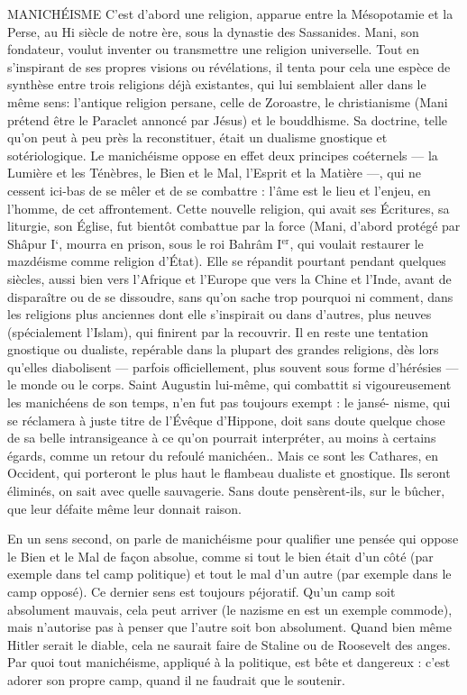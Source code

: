MANICHÉISME C'est d’abord une religion, apparue entre la Mésopotamie
et la Perse, au Hi siècle de notre ère, sous la dynastie des
Sassanides. Mani, son fondateur, voulut inventer ou transmettre une religion
universelle. Tout en s’inspirant de ses propres visions ou révélations, il tenta
pour cela une espèce de synthèse entre trois religions déjà existantes, qui lui
semblaient aller dans le même sens: l’antique religion persane, celle de
Zoroastre, le christianisme (Mani prétend être le Paraclet annoncé par Jésus)
et le bouddhisme. Sa doctrine, telle qu’on peut à peu près la reconstituer,
était un dualisme gnostique et sotériologique. Le manichéisme oppose en
effet deux principes coéternels — la Lumière et les Ténèbres, le Bien et le Mal,
l'Esprit et la Matière —, qui ne cessent ici-bas de se mêler et de se combattre :
l’âme est le lieu et l’enjeu, en l’homme, de cet affrontement. Cette nouvelle
religion, qui avait ses Écritures, sa liturgie, son Église, fut bientôt combattue
par la force (Mani, d’abord protégé par Shâpur I‘, mourra en prison, sous le
roi Bahrâm I$^\text{er}$, qui voulait restaurer le mazdéisme comme religion d’État).
Elle se répandit pourtant pendant quelques siècles, aussi bien vers l'Afrique
et l’Europe que vers la Chine et l’Inde, avant de disparaître ou de se dissoudre,
sans qu’on sache trop pourquoi ni comment, dans les religions plus
anciennes dont elle s’inspirait ou dans d’autres, plus neuves (spécialement
l'Islam), qui finirent par la recouvrir. Il en reste une tentation gnostique ou
dualiste, repérable dans la plupart des grandes religions, dès lors qu’elles diabolisent
— parfois officiellement, plus souvent sous forme d’hérésies — le
monde ou le corps. Saint Augustin lui-même, qui combattit si vigoureusement
les manichéens de son temps, n’en fut pas toujours exempt : le jansé-
nisme, qui se réclamera à juste titre de l’Évêque d’Hippone, doit sans doute
quelque chose de sa belle intransigeance à ce qu’on pourrait interpréter, au
moins à certains égards, comme un retour du refoulé manichéen.. Mais ce
sont les Cathares, en Occident, qui porteront le plus haut le flambeau dualiste
et gnostique. Ils seront éliminés, on sait avec quelle sauvagerie. Sans
doute pensèrent-ils, sur le bûcher, que leur défaite même leur donnait
raison.

En un sens second, on parle de manichéisme pour qualifier une pensée
qui oppose le Bien et le Mal de façon absolue, comme si tout le bien était
d’un côté (par exemple dans tel camp politique) et tout le mal d’un autre (par
exemple dans le camp opposé). Ce dernier sens est toujours péjoratif. Qu'un
camp soit absolument mauvais, cela peut arriver (le nazisme en est un
exemple commode), mais n’autorise pas à penser que l’autre soit bon absolument.
Quand bien même Hitler serait le diable, cela ne saurait faire de Staline
ou de Roosevelt des anges. Par quoi tout manichéisme, appliqué à la
politique, est bête et dangereux : c’est adorer son propre camp, quand il ne
faudrait que le soutenir.

